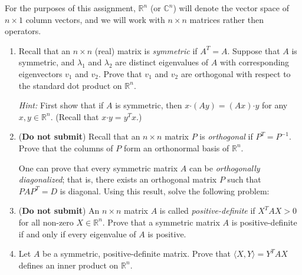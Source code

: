 \documentclass[letterpaper,12pt]{article}
\newcommand{\R}{\mathbb{R}}
\newcommand{\C}{\mathbb{C}}
\begin{document}
For the purposes of this assignment, $\R^n$ (or $\C^n$) will denote the vector space of $n\times 1$ column vectors, and we will work with $n\times n$ matrices rather then operators.
\begin{enumerate}
 \item Recall that an $n\times n$ (real) matrix is {\em symmetric} if $A^T=A$. Suppose that $A$ is symmetric, and $\lambda_1$ and $\lambda_2$ are distinct eigenvalues of $A$ with corresponding eigenvectors $v_1$ and $v_2$. Prove that $v_1$ and $v_2$ are orthogonal with respect to the standard dot product on $\R^n$.

{\em Hint:} First show that if $A$ is symmetric, then $x\boldsymbol{\cdot}(Ay) = (Ax)\boldsymbol{\cdot}y$ for any $x,y\in\R^n$. (Recall that $x\boldsymbol{\cdot}y = y^Tx$.)
 
 \item ({\bf Do not submit}) Recall that an $n\times n$ matrix $P$ is {\em orthogonal} if $P^T = P^{-1}$. Prove that the columns of $P$ form an orthonormal basis of $\R^n$.
 
One can prove that every symmetric matrix $A$ can be {\em orthogonally diagonalized}; that is, there exists an orthogonal matrix $P$ such that $PAP^T=D$ is diagonal. Using this result, solve the following problem:

 \item ({\bf Do not submit}) An $n\times n$ matrix $A$ is called {\em positive-definite} if $X^TAX> 0$ for all non-zero $X\in \R^n$. Prove that a symmetric matrix $A$ is positive-definite if and only if every eigenvalue of $A$ is positive.
 
 \item Let $A$ be a symmetric, positive-definite matrix. Prove that $\langle X,Y\rangle = Y^TAX$ defines an inner product on $\R^n$.
 

\end{enumerate}
\end{document}
